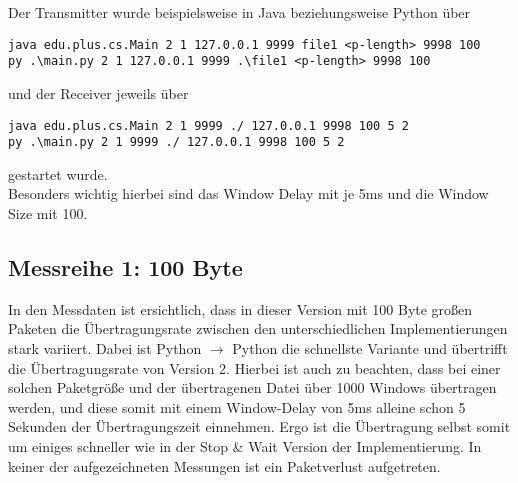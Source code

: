 \documentclass{article}
\begin{document}
    Der Transmitter wurde beispielsweise in Java beziehungsweise Python über
    \begin{lstlisting}
java edu.plus.cs.Main 2 1 127.0.0.1 9999 file1 <p-length> 9998 100
py .\main.py 2 1 127.0.0.1 9999 .\file1 <p-length> 9998 100
    \end{lstlisting}und der Receiver jeweils über
    \begin{lstlisting}
java edu.plus.cs.Main 2 1 9999 ./ 127.0.0.1 9998 100 5 2
py .\main.py 2 1 9999 ./ 127.0.0.1 9998 100 5 2
    \end{lstlisting}
    gestartet wurde.\\

    Besonders wichtig hierbei sind das Window Delay mit je 5ms und die Window Size mit 100.

    \subsection{Messreihe 1: 100 Byte}
    In den Messdaten ist ersichtlich, dass in dieser Version mit 100 Byte großen Paketen die Übertragungsrate zwischen
    den unterschiedlichen Implementierungen stark variiert.
    Dabei ist Python $\rightarrow$ Python die schnellste Variante und übertrifft die Übertragungsrate von Version 2.
    Hierbei ist auch zu beachten, dass bei einer solchen Paketgröße und der übertragenen Datei über 1000 Windows
    übertragen werden, und diese somit mit einem Window-Delay von 5ms alleine schon 5 Sekunden der Übertragungszeit
    einnehmen.
    Ergo ist die Übertragung selbst somit um einiges schneller wie in der Stop & Wait Version der Implementierung.
    In keiner der aufgezeichneten Messungen ist ein Paketverlust aufgetreten.
\end{document}
